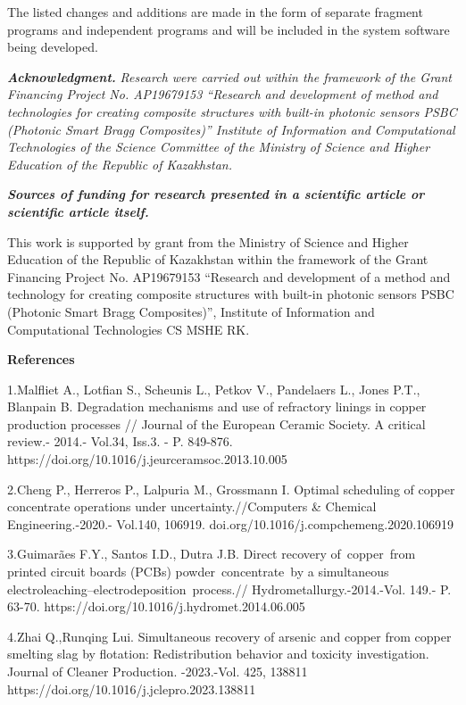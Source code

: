 The listed changes and additions are made in the form of separate
fragment programs and independent programs and will be included in the
system software being developed.

\emph{{\bfseries Acknowledgment.}} \emph{Research were carried out within
the framework of the Grant Financing Project No. AP19679153 ``Research
and development of method and technologies for creating composite
structures with built-in photonic sensors PSBC (Photonic Smart Bragg
Composites)'' Institute of Information and Computational Technologies of
the Science Committee of the Ministry of Science and Higher Education of
the Republic of Kazakhstan.}

\emph{{\bfseries Sources of funding for research presented in a scientific
article or scientific article itself.}}

This work is supported by grant from the Ministry of Science and Higher
Education of the Republic of Kazakhstan within the framework of the
Grant Financing Project No. AP19679153 ``Research and development of a
method and technology for creating composite structures with built-in
photonic sensors PSBC (Photonic Smart Bragg Composites)'', Institute of
Information and Computational Technologies CS MSHE RK.

{\bfseries References}

1.Malfliet A., Lotfian S., Scheunis L., Petkov V., Pandelaers L., Jones
P.T., Blanpain B. Degradation mechanisms and use of refractory linings
in copper production processes // Journal of the European Ceramic
Society. A critical review.- 2014.- Vol.34, Iss.3. - P. 849-876.
https://doi.org/10.1016/j.jeurceramsoc.2013.10.005

2.Cheng P., Herreros P., Lalpuria M., Grossmann I. Optimal scheduling of
copper concentrate operations under uncertainty.//Computers \& Chemical
Engineering.-2020.- Vol.140, 106919.
doi.org/10.1016/j.compchemeng.2020.106919

3.Guimarães F.Y., Santos I.D., Dutra J.B. Direct recovery of~copper~from
printed circuit boards (PCBs) powder~concentrate~by a simultaneous
electroleaching--electrodeposition~process.//
Hydrometallurgy.-2014.-Vol. 149.- P. 63-70.
https://doi.org/10.1016/j.hydromet.2014.06.005

4.Zhai Q.,Runqing Lui. Simultaneous recovery of arsenic and copper from
copper smelting slag by flotation: Redistribution behavior and toxicity
investigation. Journal of Cleaner Production. -2023.-Vol. 425, 138811
https://doi.org/10.1016/j.jclepro.2023.138811

